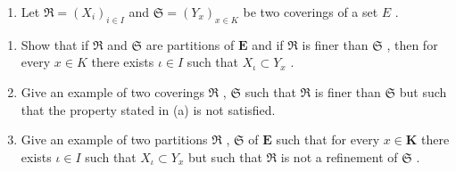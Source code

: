 \begin{enumerate}
\def\labelenumi{\arabic{enumi}.}
\setcounter{enumi}{7}
\tightlist
\item
  Let \(\Re = (X_{i})_{i\in I}\) and \(\mathfrak{S} = (Y_x)_{x\in K}\) be two coverings of a set \(E\) .
\end{enumerate}

\begin{enumerate}
\def\labelenumi{(\alph{enumi})}
\item
  Show that if \(\mathfrak{R}\) and \(\mathfrak{S}\) are partitions of \(\mathbf{E}\) and if \(\mathfrak{R}\) is finer than \(\mathfrak{S}\) , then for every \(x \in K\) there exists \(\iota \in I\) such that \(X_{\iota} \subset Y_{x}\) .
\item
  Give an example of two coverings \(\mathfrak{R}\) , \(\mathfrak{S}\) such that \(\mathfrak{R}\) is finer than \(\mathfrak{S}\) but such that the property stated in (a) is not satisfied.
\item
  Give an example of two partitions \(\mathfrak{R}\) , \(\mathfrak{S}\) of \(\mathbf{E}\) such that for every \(x \in \mathbf{K}\) there exists \(\iota \in I\) such that \(X_{\iota} \subset Y_{x}\) but such that \(\mathfrak{R}\) is not a refinement of \(\mathfrak{S}\) .
\end{enumerate}

